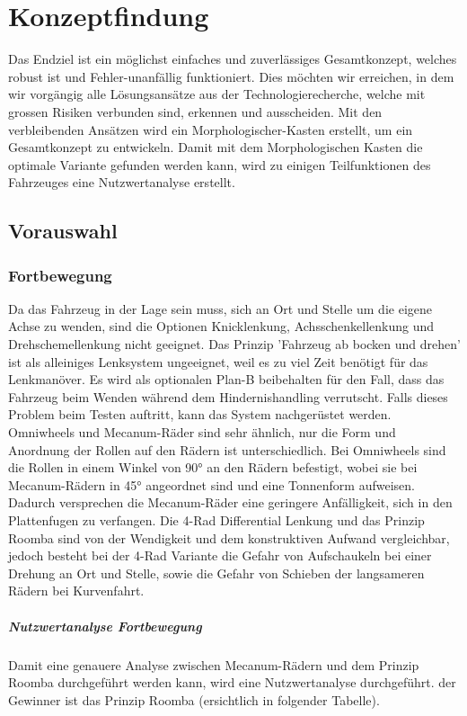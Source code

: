 \newpage
\section{Konzeptfindung}

Das Endziel ist ein möglichst einfaches und zuverlässiges Gesamtkonzept, welches robust ist und Fehler-unanfällig funktioniert. Dies möchten wir erreichen, in dem wir vorgängig alle Lösungsansätze aus der Technologierecherche, welche mit grossen Risiken verbunden sind, erkennen und ausscheiden. Mit den verbleibenden Ansätzen wird ein Morphologischer-Kasten erstellt, um ein Gesamtkonzept zu entwickeln. Damit mit dem Morphologischen Kasten die optimale Variante gefunden werden kann, wird zu einigen Teilfunktionen des Fahrzeuges eine Nutzwertanalyse erstellt.

\subsection{Vorauswahl}
    \subsubsection{Fortbewegung}
        Da das Fahrzeug in der Lage sein muss, sich an Ort und Stelle um die eigene Achse zu wenden, sind die Optionen Knicklenkung, Achsschenkellenkung und Drehschemellenkung nicht geeignet.
        Das Prinzip 'Fahrzeug ab bocken und drehen' ist als alleiniges Lenksystem ungeeignet, weil es zu viel Zeit benötigt für das Lenkmanöver. Es wird als optionalen Plan-B beibehalten für den Fall, dass das Fahrzeug beim Wenden während dem Hindernishandling verrutscht. Falls dieses Problem beim Testen auftritt, kann das System nachgerüstet werden.
        Omniwheels und Mecanum-Räder sind sehr ähnlich, nur die Form und Anordnung der Rollen auf den Rädern ist unterschiedlich. Bei Omniwheels sind die Rollen in einem Winkel von 90° an den Rädern befestigt, wobei sie bei Mecanum-Rädern in 45° angeordnet sind und eine Tonnenform aufweisen. Dadurch versprechen die Mecanum-Räder eine geringere Anfälligkeit, sich in den Plattenfugen zu verfangen. Die 4-Rad Differential Lenkung und das Prinzip Roomba sind von der Wendigkeit und dem konstruktiven Aufwand vergleichbar, jedoch besteht bei der 4-Rad Variante die Gefahr von Aufschaukeln bei einer Drehung an Ort und Stelle, sowie die Gefahr von Schieben der langsameren Rädern bei Kurvenfahrt.

        \subparagraph{Nutzwertanalyse Fortbewegung}
        Damit eine genauere Analyse zwischen Mecanum-Rädern und dem Prinzip Roomba durchgeführt werden kann, wird eine Nutzwertanalyse durchgeführt. der Gewinner ist das Prinzip Roomba (ersichtlich in folgender Tabelle).
        

